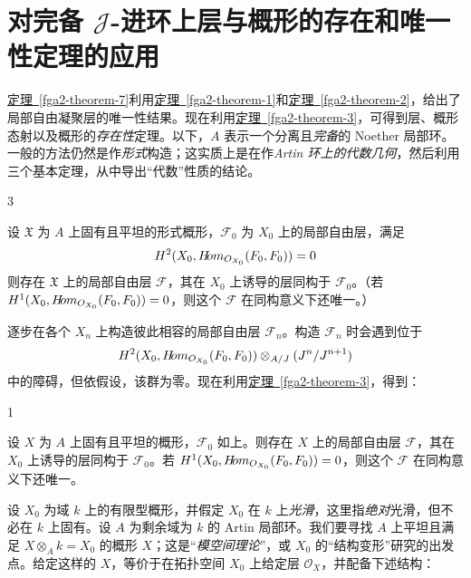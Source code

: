 \chapter{对完备 \(\mathscr {J}\)-进环上层与概形的存在和唯一性定理的应用}\thispagestyle{fancy}\label{fga2-6}
\par{}\hyperref[fga2-theorem-7]{定理~\ref*{fga2-theorem-7}}利用\hyperref[fga2-theorem-1]{定理~\ref*{fga2-theorem-1}}和\hyperref[fga2-theorem-2]{定理~\ref*{fga2-theorem-2}}，给出了局部自由凝聚层的唯一性结果。现在利用\hyperref[fga2-theorem-3]{定理~\ref*{fga2-theorem-3}}，可得到层、概形态射以及概形的\emph{存在性}定理。以下，\(A\) 表示一个分离且\emph{完备}的 Noether 局部环。一般的方法仍然是作\emph{形式}构造；这实质上是在作\emph{Artin 环上的代数几何}，然后利用三个基本定理，从中导出“代数”性质的结论。
\begin{proposition}{3}\label{fga2-proposition-3}\skipsinglepar
\par{}设 \(\mathfrak {X}\) 为 \(A\) 上固有且平坦的形式概形，\(\mathscr {F}_0\) 为 \(X_0\) 上的局部自由层，满足 \[\operatorname {H}^2(X_0,\mathscr {H}\kern  -2.5pt\mathit {om}_{\mathcal {O}_{X_0}}(\mathscr {F}_0,\mathscr {F}_0))=0\]则存在 \(\mathfrak {X}\) 上的局部自由层 \(\mathscr {F}\)，其在 \(X_0\) 上诱导的层同构于 \(\mathscr {F}_0\)。（若 \(\operatorname {H}^1(X_0,\mathscr {H}\kern  -2.5pt\mathit {om}_{\mathcal {O}_{X_0}}(\mathscr {F}_0,\mathscr {F}_0))=0\)，则这个 \(\mathscr {F}\) 在同构意义下还唯一。）\end{proposition}
\par{}逐步在各个 \(X_n\) 上构造彼此相容的局部自由层 \(\mathscr {F}_n\)。构造 \(\mathscr {F}_n\) 时会遇到位于 \[\operatorname {H}^2(X_0,\mathscr {H}\kern  -2.5pt\mathit {om}_{\mathcal {O}_{X_0}}(\mathscr {F}_0,\mathscr {F}_0))\otimes _{A/\mathscr {J}}(\mathscr {J}^n/\mathscr {J}^{n+1})\] 中的障碍，但依假设，该群为零。现在利用\hyperref[fga2-theorem-3]{定理~\ref*{fga2-theorem-3}}，得到：
\begin{corollary}{1}\label{fga2-proposition-3-corollary-1}\skipsinglepar
\par{}设 \(X\) 为 \(A\) 上固有且平坦的概形，\(\mathscr {F}_0\) 如上。则存在 \(X\) 上的局部自由层 \(\mathscr {F}\)，其在 \(X_0\) 上诱导的层同构于 \(\mathscr {F}_0\)。若 \(\operatorname {H}^1(X_0,\mathscr {H}\kern  -2.5pt\mathit {om}_{\mathcal {O}_{X_0}}(\mathscr {F}_0,\mathscr {F}_0))=0\)，则这个 \(\mathscr {F}\) 在同构意义下还唯一。\end{corollary}
\par{}设 \(X_0\) 为域 \(k\) 上的有限型概形，并假定 \(X_0\) 在 \(k\) 上\emph{光滑}，这里指\emph{绝对}光滑，但不必在 \(k\) 上固有。设 \(A\) 为剩余域为 \(k\) 的 Artin 局部环。我们要寻找 \(A\) 上平坦且满足 \(X\otimes _A k=X_0\) 的概形 \(X\)；这是“\emph{模空间理论}”，或 \(X_0\) 的“结构变形”研究的出发点。给定这样的 \(X\)，等价于在拓扑空间 \(X_0\) 上给定层 \(\mathcal {O}_X\)，并配备下述结构：
